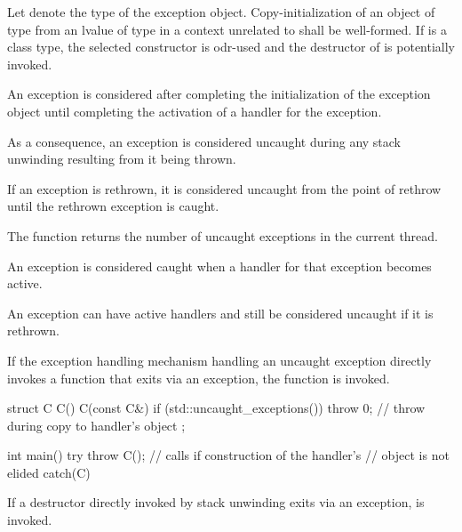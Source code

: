 \pnum
{}%
%
Let  denote the type of the exception object.
Copy-initialization of an object of type  from
an lvalue of type  in a context unrelated to 
shall be well-formed.
If  is a class type,
the selected constructor is odr-used and
the destructor of  is potentially invoked.

\pnum
{}%
An exception is considered 
after completing the initialization of the exception object
until completing the activation of a handler for the exception.
\begin{note}
As a consequence, an exception is considered uncaught
during any stack unwinding resulting from it being thrown.
\end{note}

\pnum
{}%
If an exception is rethrown,
it is considered uncaught from the point of rethrow
until the rethrown exception is caught.
\begin{note}
The function 
returns the number of uncaught exceptions in the current thread.
\end{note}

\pnum
{}%
%
An exception is considered caught when a handler for that exception
becomes active.
\begin{note}
An exception can have active handlers and still be considered uncaught if
it is rethrown.
\end{note}

\pnum
{}%
%
If the exception handling mechanism
handling an uncaught exception
directly invokes a function that exits via an
exception, the function  is invoked.
\begin{example}
\begin{codeblock}
struct C {
  C() { }
  C(const C&) {
    if (std::uncaught_exceptions()) {
      throw 0;      // throw during copy to handler's  object
    }
  }
};

int main() {
  try {
    throw C();      // calls  if construction of the handler's
                    //  object is not elided
  } catch(C) { }
}
\end{codeblock}
\end{example}
\begin{note}
If a destructor directly invoked by stack unwinding exits via an exception,
 is invoked.
\end{note}


